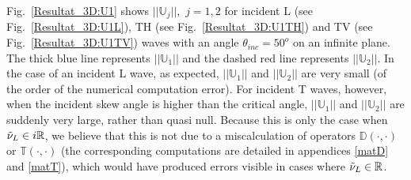 Fig.~\ref{Resultat_3D:U1} shows $||\mathbb{U}_j||, \, \, j=1,2$ for incident L (see Fig.~\ref{Resultat_3D:U1L}), TH (see Fig.~\ref{Resultat_3D:U1TH}) and TV (see Fig.~\ref{Resultat_3D:U1TV}) waves with an angle $\theta_{inc}=50^o$ on an infinite plane. The thick blue line represents $||\mathbb{U}_1||$ and the dashed red line represents $||\mathbb{U}_2||$. In the case of an incident L wave, as expected, $||\mathbb{U}_1||$ and $||\mathbb{U}_2||$ are very small (of the order of the numerical computation error). For incident T waves, however, when the incident skew angle is higher than the critical angle, $||\mathbb{U}_1||$ and $||\mathbb{U}_2||$ are suddenly very large, rather than quasi null. Because this is only the case when $\tilde{\nu}_L \in i\mathbb{R}$, we believe that this is not due to a miscalculation of operators $\mathbb{D}(\cdot,\cdot)$ or $\mathbb{T}(\cdot,\cdot)$ (the corresponding computations are detailed in appendices \ref{matD} and \ref{matT}), which would have produced errors visible in cases where $\tilde{\nu}_L \in \mathbb{R}$. 

